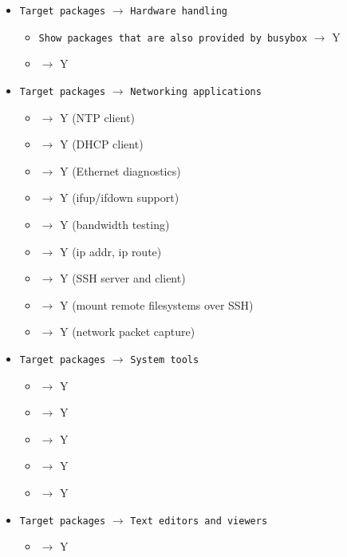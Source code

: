 \begin{itemize}
    \item \texttt{Target packages} $\rightarrow$ \texttt{Hardware handling}
    \begin{itemize}
        \item \texttt{Show packages that are also provided by busybox} $\rightarrow$ Y
        \item {} $\rightarrow$ Y
    \end{itemize}
    \item \texttt{Target packages} $\rightarrow$ \texttt{Networking applications}
    \begin{itemize}
        \item {} $\rightarrow$ Y (NTP client)
        \item {} $\rightarrow$ Y (DHCP client)
        \item {} $\rightarrow$ Y (Ethernet diagnostics)
        \item {} $\rightarrow$ Y (ifup/ifdown support)
        \item {} $\rightarrow$ Y (bandwidth testing)
        \item {} $\rightarrow$ Y (ip addr, ip route)
        \item {} $\rightarrow$ Y (SSH server and client)
        \item {} $\rightarrow$ Y (mount remote filesystems over SSH)
        \item {} $\rightarrow$ Y (network packet capture)
    \end{itemize}
    \item \texttt{Target packages} $\rightarrow$ \texttt{System tools}
    \begin{itemize}
        \item {} $\rightarrow$ Y
        \item {} $\rightarrow$ Y
        \item {} $\rightarrow$ Y
        \item {} $\rightarrow$ Y
        \item {} $\rightarrow$ Y
    \end{itemize}
    \item \texttt{Target packages} $\rightarrow$ \texttt{Text editors and viewers}
    \begin{itemize}
        \item {} $\rightarrow$ Y
    \end{itemize}
\end{itemize}

